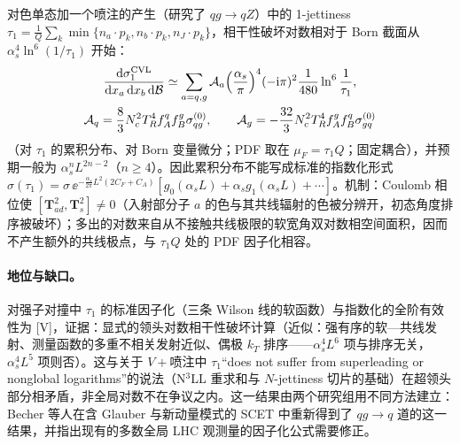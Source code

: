 \begin{proposition}\label{prop:front-jettiness-cvl}
对色单态加一个喷注的产生（研究了 $qg\to qZ$）中的 1-jettiness $\tau_1=\frac1Q\sum_k\min\{n_a\cdot p_k,n_b\cdot p_k,n_J\cdot p_k\}$\cite{Stewart:2010tn}，相干性破坏对数相对于 Born 截面从 $\alpha_s^4\ln^6(1/\tau_1)$ 开始：
\begin{equation}\label{eq:front-cvl}
\begin{gathered}
\frac{\mathrm{d}\sigma_1^{\rm CVL}}{\mathrm{d} x_a\,\mathrm{d} x_b\,\mathrm{d}\mathcal B}\simeq\sum_{a=q,g}\mathcal A_a\Bigl(\frac{\alpha_s}{\pi}\Bigr)^4(-\mathrm{i}\pi)^2\frac{1}{480}\ln^6\frac1{\tau_1},\\
\mathcal A_q=\frac83N_c^2T_R^4f^q_Af^g_B\sigma^{(0)}_{qg},\qquad \mathcal A_g=-\frac{32}3N_c^2T_R^4f^g_Af^q_B\sigma^{(0)}_{gq}
\end{gathered}
\end{equation}
（对 $\tau_1$ 的累积分布、对 Born 变量微分；PDF 取在 $\mu_F=\tau_1Q$；固定耦合），并预期一般为 $\alpha_s^nL^{2n-2}$（$n\ge4$）。因此累积分布不能写成标准的指数化形式 $\sigma(\tau_1)=\sigma\,\ee^{-\frac{\alpha_s}{2\pi}L^2(2C_F+C_A)}[g_0(\alpha_sL)+\alpha_sg_1(\alpha_sL)+\cdots]$\cite[式~(1)--(18)]{Banfi:2025mra}。机制：Coulomb 相位使 $[\mathbf T^2_{ad},\mathbf T^2_s]\ne0$（入射部分子 $a$ 的色与其共线辐射的色被分辨开，初态角度排序被破坏）；多出的对数来自从不接触共线极限的软宽角双对数相空间面积，因而不产生额外的共线极点，与 $\tau_1Q$ 处的 PDF 因子化相容。
\end{proposition}

\paragraph{地位与缺口。}对强子对撞中 $\tau_1$ 的标准因子化（三条 Wilson 线的软函数）与指数化的全阶有效性为 [V]，证据：显式的领头对数相干性破坏计算（近似：强有序的软—共线发射、测量函数的多重不相关发射近似、偶极 $k_T$ 排序——$\alpha_s^4L^6$ 项与排序无关，$\alpha_s^4L^5$ 项则否）。这与\cite{Alioli:2023rxx}关于 $V+$喷注中 $\tau_1$“does not suffer from superleading or nonglobal logarithms”的说法（N$^3$LL 重求和与 $N$-jettiness 切片的基础）在超领头部分相矛盾，非全局对数不在争议之内。这一结果由两个研究组用不同方法建立：Becher 等人在含 Glauber 与新动量模式的 SCET 中重新得到了 $qg\to q$ 道的这一结果\cite{Becher:2026kbr}，并指出现有的多数全局 LHC 观测量的因子化公式需要修正。

